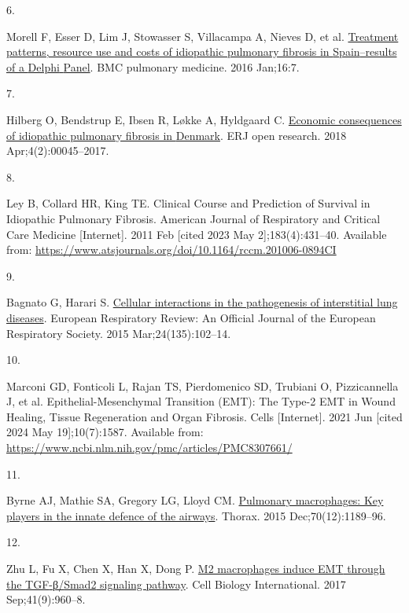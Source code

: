 \documentclass[
]{article}
\newlength{\cslhangindent}
\newlength{\csllabelwidth}
\newlength{\cslentryspacingunit} %
\newenvironment{CSLReferences}[2] %
 {%
  \setlength{\parindent}{0pt}
  \ifodd #1
  \let\oldpar\par
  \def\par{\hangindent=\cslhangindent\oldpar}
  \fi
  \setlength{\parskip}{#2\cslentryspacingunit}
 }%
 {}
\newcommand{\CSLLeftMargin}[1]{\parbox[t]{\csllabelwidth}{#1}}
\newcommand{\CSLRightInline}[1]{\parbox[t]{\linewidth - \csllabelwidth}{#1}\break}
\begin{document}
\begin{CSLReferences}{0}{0}
\leavevmode{}%
\CSLLeftMargin{6. }%
\CSLRightInline{Morell F, Esser D, Lim J, Stowasser S, Villacampa A, Nieves D, et al. \href{https://doi.org/10.1186/s12890-016-0168-6}{Treatment patterns, resource use and costs of idiopathic pulmonary fibrosis in {Spain}--results of a {Delphi} {Panel}}. BMC pulmonary medicine. 2016 Jan;16:7. }

\leavevmode{}%
\CSLLeftMargin{7. }%
\CSLRightInline{Hilberg O, Bendstrup E, Ibsen R, Løkke A, Hyldgaard C. \href{https://doi.org/10.1183/23120541.00045-2017}{Economic consequences of idiopathic pulmonary fibrosis in {Denmark}}. ERJ open research. 2018 Apr;4(2):00045--2017. }

\leavevmode{}%
\CSLLeftMargin{8. }%
\CSLRightInline{Ley B, Collard HR, King TE. Clinical {Course} and {Prediction} of {Survival} in {Idiopathic} {Pulmonary} {Fibrosis}. American Journal of Respiratory and Critical Care Medicine {[}Internet{]}. 2011 Feb {[}cited 2023 May 2{]};183(4):431--40. Available from: \url{https://www.atsjournals.org/doi/10.1164/rccm.201006-0894CI}}

\leavevmode{}%
\CSLLeftMargin{9. }%
\CSLRightInline{Bagnato G, Harari S. \href{https://doi.org/10.1183/09059180.00003214}{Cellular interactions in the pathogenesis of interstitial lung diseases}. European Respiratory Review: An Official Journal of the European Respiratory Society. 2015 Mar;24(135):102--14. }

\leavevmode{}%
\CSLLeftMargin{10. }%
\CSLRightInline{Marconi GD, Fonticoli L, Rajan TS, Pierdomenico SD, Trubiani O, Pizzicannella J, et al. Epithelial-{Mesenchymal} {Transition} ({EMT}): {The} {Type}-2 {EMT} in {Wound} {Healing}, {Tissue} {Regeneration} and {Organ} {Fibrosis}. Cells {[}Internet{]}. 2021 Jun {[}cited 2024 May 19{]};10(7):1587. Available from: \url{https://www.ncbi.nlm.nih.gov/pmc/articles/PMC8307661/}}

\leavevmode{}%
\CSLLeftMargin{11. }%
\CSLRightInline{Byrne AJ, Mathie SA, Gregory LG, Lloyd CM. \href{https://doi.org/10.1136/thoraxjnl-2015-207020}{Pulmonary macrophages: Key players in the innate defence of the airways}. Thorax. 2015 Dec;70(12):1189--96. }

\leavevmode{}%
\CSLLeftMargin{12. }%
\CSLRightInline{Zhu L, Fu X, Chen X, Han X, Dong P. \href{https://doi.org/10.1002/cbin.10788}{M2 macrophages induce {EMT} through the {TGF}-β/{Smad2} signaling pathway}. Cell Biology International. 2017 Sep;41(9):960--8. }


\end{CSLReferences}
\end{document}
